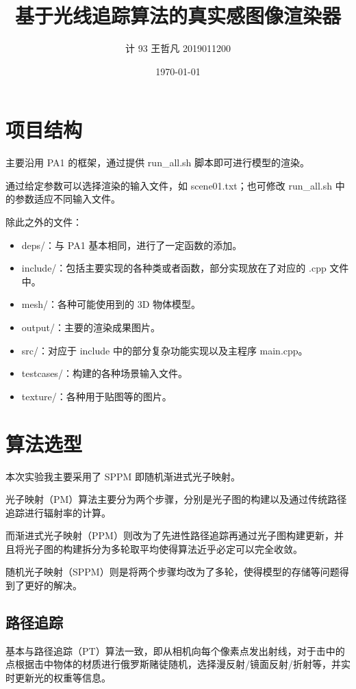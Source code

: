 \documentclass[a4paper]{article}
\title{基于光线追踪算法的真实感图像渲染器}
\author{计 93 王哲凡 2019011200}
\date{\today}
\begin{document}
    \maketitle
    \tableofcontents

    \newpage
    \section{项目结构}
    主要沿用 PA1 的框架，通过提供 run\_all.sh 脚本即可进行模型的渲染。
    
    通过给定参数可以选择渲染的输入文件，如 scene01.txt；也可修改 run\_all.sh 中的参数适应不同输入文件。

    除此之外的文件：
    \begin{itemize}
        \item deps/：与 PA1 基本相同，进行了一定函数的添加。
        \item include/：包括主要实现的各种类或者函数，部分实现放在了对应的 .cpp 文件中。
        \item mesh/：各种可能使用到的 3D 物体模型。
        \item output/：主要的渲染成果图片。
        \item src/：对应于 include 中的部分复杂功能实现以及主程序 main.cpp。
        \item testcases/：构建的各种场景输入文件。
        \item texture/：各种用于贴图等的图片。
    \end{itemize}
    
    \newpage
    \section{算法选型}
    本次实验我主要采用了 SPPM 即随机渐进式光子映射。
    
    光子映射（PM）算法主要分为两个步骤，分别是光子图的构建以及通过传统路径追踪进行辐射率的计算。
    
    而渐进式光子映射（PPM）则改为了先进性路径追踪再通过光子图构建更新，并且将光子图的构建拆分为多轮取平均使得算法近乎必定可以完全收敛。

    随机光子映射（SPPM）则是将两个步骤均改为了多轮，使得模型的存储等问题得到了更好的解决。

    \subsection{路径追踪}
    基本与路径追踪（PT）算法一致，即从相机向每个像素点发出射线，对于击中的点根据击中物体的材质进行俄罗斯赌徒随机，选择漫反射/镜面反射/折射等，并实时更新光的权重等信息。
\end{document}
